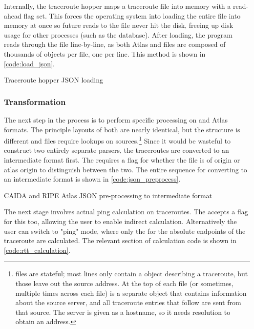 Internally, the traceroute hopper maps a traceroute file into memory with a read-ahead flag set. This forces the operating system into loading the entire file into memory at once so future reads to the file never hit the disk, freeing up disk usage for other processes (such as the database). After loading, the program reads through the file line-by-line, as both \ripe Atlas and \caida \json files are composed of thousands of \json objects per file, one per line. This method is shown in \cref{code:load_json}.

\begin{code}[h]
    \caption{Traceroute hopper JSON loading}
    \label{code:load_json}
\end{code}

\subsubsection{Transformation} The next step in the process is to perform specific processing on \caida and \ripe Atlas \json formats. The principle layouts of both are nearly identical, but the structure is different and \caida files require \dns lookups on sources.\footnote{\caida files are stateful; most lines only contain a \json object describing a traceroute, but those leave out the source \ip address. At the top of each file (or sometimes, multiple times across each file) is a separate \json object that contains information about the source server, and all traceroute entries that follow are sent from that source. The server is given as a hostname, so it needs \dns resolution to obtain an \ip address.} Since it would be wasteful to construct two entirely separate parsers, the traceroutes are converted to an intermediate format first. The \cli requires a flag for whether the file is of \caida origin or \ripe atlas origin to distinguish between the two. The entire sequence for converting to an intermediate format is shown in \cref{code:json_preprocess}.

\begin{code}[h]
    \caption{CAIDA and RIPE Atlas JSON pre-processing to intermediate format}
    \label{code:json_preprocess}
\end{code}

The next stage involves actual ping calculation on traceroutes. The \cli accepts a flag for this too, allowing the user to enable indirect calculation. Alternatively the user can switch to "ping" mode, where only the \rtt for the absolute endpoints of the traceroute are calculated. The relevant section of calculation code is shown in \cref{code:rtt_calculation}.

